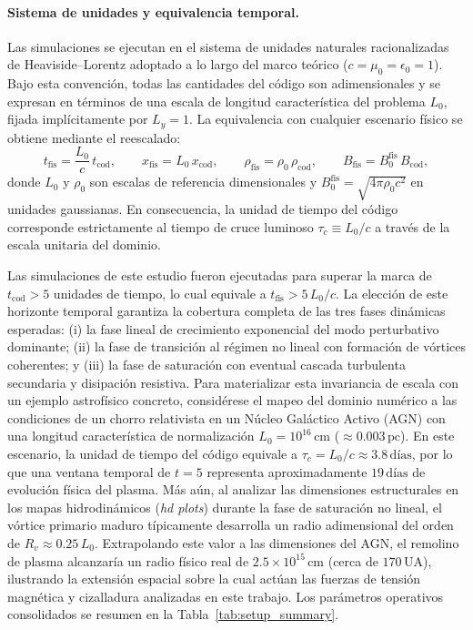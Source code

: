 \paragraph{Sistema de unidades y equivalencia temporal.} Las simulaciones se ejecutan en el sistema de unidades naturales racionalizadas de Heaviside--Lorentz adoptado a lo largo del marco teórico ($c = \mu_0 = \epsilon_0 = 1$). Bajo esta convención, todas las cantidades del código son adimensionales y se expresan en términos de una escala de longitud característica del problema $L_0$, fijada implícitamente por $L_y = 1$. La equivalencia con cualquier escenario físico se obtiene mediante el reescalado:
\begin{equation}
    t_{\text{fis}} = \frac{L_0}{c}\, t_{\text{cod}},\qquad
    x_{\text{fis}} = L_0\, x_{\text{cod}},\qquad
    \rho_{\text{fis}} = \rho_0\, \rho_{\text{cod}},\qquad
    B_{\text{fis}} = B_0^{\text{fis}}\, B_{\text{cod}},
    \label{eq:unidades_reescalado}
\end{equation}
donde $L_0$ y $\rho_0$ son escalas de referencia dimensionales y $B_0^{\text{fis}} = \sqrt{4\pi\rho_0 c^2}$ en unidades gaussianas. En consecuencia, la unidad de tiempo del código corresponde estrictamente al tiempo de cruce luminoso $\tau_c \equiv L_0 / c$ a través de la escala unitaria del dominio.

Las simulaciones de este estudio fueron ejecutadas para superar la marca de $t_{\text{cod}} > 5$ unidades de tiempo, lo cual equivale a $t_{\text{fis}} > 5\, L_0/c$. La elección de este horizonte temporal garantiza la cobertura completa de las tres fases dinámicas esperadas: (i) la fase lineal de crecimiento exponencial del modo perturbativo dominante; (ii) la fase de transición al régimen no lineal con formación de vórtices coherentes; y (iii) la fase de saturación con eventual cascada turbulenta secundaria y disipación resistiva. Para materializar esta invariancia de escala con un ejemplo astrofísico concreto, considérese el mapeo del dominio numérico a las condiciones de un chorro relativista en un Núcleo Galáctico Activo (AGN) con una longitud característica de normalización $L_0 = 10^{16}\,\text{cm}$ ($\approx 0.003\,\text{pc}$). En este escenario, la unidad de tiempo del código equivale a $\tau_c = L_0/c \approx 3.8\,\text{días}$, por lo que una ventana temporal de $t=5$ representa aproximadamente $19\,\text{días}$ de evolución física del plasma. Más aún, al analizar las dimensiones estructurales en los mapas hidrodinámicos (\textit{hd plots}) durante la fase de saturación no lineal, el vórtice primario maduro típicamente desarrolla un radio adimensional del orden de $R_v \approx 0.25\, L_0$. Extrapolando este valor a las dimensiones del AGN, el remolino de plasma alcanzaría un radio físico real de $2.5 \times 10^{15}\,\text{cm}$ (cerca de $170\,\text{UA}$), ilustrando la extensión espacial sobre la cual actúan las fuerzas de tensión magnética y cizalladura analizadas en este trabajo. Los parámetros operativos consolidados se resumen en la Tabla~\ref{tab:setup_summary}.


